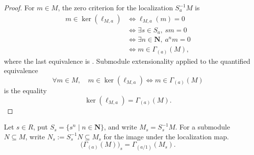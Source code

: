 \begin{proof}
  For $m\in M$, the zero criterion for the localization $S_a^{-1}M$ is
  \[
  \begin{aligned}
    m\in\ker(\ell_{M,a})
      &\Longleftrightarrow \ell_{M,a}(m)=0\\
      &\Longleftrightarrow \exists s\in S_a,\ sm=0\\
      &\Longleftrightarrow \exists n\in\mathbf N,\ a^nm=0\\
      &\Longleftrightarrow m\in\Gamma_{(a)}(M),
  \end{aligned}
  \]
  where the last equivalence is
  .  Submodule extensionality applied to
  the quantified equivalence
  \[
    \forall m\in M,\quad
    m\in\ker(\ell_{M,a})
      \Longleftrightarrow m\in\Gamma_{(a)}(M)
  \]
  is the equality
  \[
    \ker(\ell_{M,a})=\Gamma_{(a)}(M).
  \]
\end{proof}

\begin{lemma}
  \label{lemma:nagata-power-torsion-localization}

  Let $s\in R$, put $S_s=\{s^n\mid n\in\mathbf N\}$, and write
  $M_s=S_s^{-1}M$.  For a submodule $N\subseteq M$, write
  $N_s:=S_s^{-1}N\subseteq M_s$ for the image under the localization map.
  \[
    \bigl(\Gamma_{(a)}(M)\bigr)_s
      =\Gamma_{(a/1)}(M_s).
  \]
\end{lemma}

